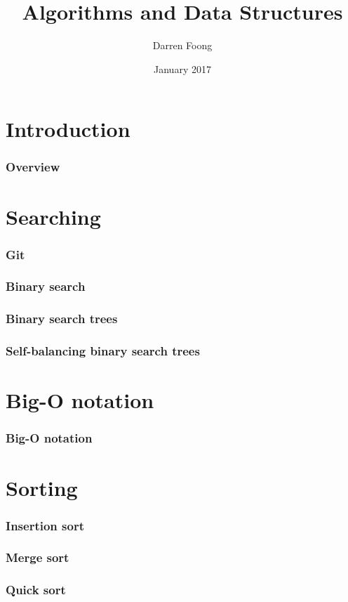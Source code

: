 \documentclass{beamer}
\title{Algorithms and Data Structures}
\author{Darren Foong}
\date{January 2017}
\begin{document}
\begin{frame}
 \titlepage
\end{frame}

\section{Introduction}

\begin{frame}
 \frametitle{Overview}
 \tableofcontents
\end{frame}

\section{Searching}

\begin{frame}
 \frametitle{Git}
\end{frame}

\begin{frame}
 \frametitle{Binary search}
\end{frame}

\begin{frame}
 \frametitle{Binary search trees}
\end{frame}

\begin{frame}
 \frametitle{Self-balancing binary search trees}
\end{frame}

\section{Big-O notation}

\begin{frame}
 \frametitle{Big-O notation}
\end{frame}

\section{Sorting}

\begin{frame}
 \frametitle{Insertion sort}
\end{frame}

\begin{frame}
 \frametitle{Merge sort}
\end{frame}

\begin{frame}
 \frametitle{Quick sort}
\end{frame}
\end{document}

